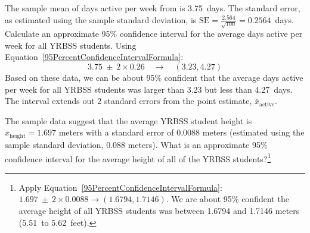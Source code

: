 \begin{spacing}{1.5}

\begin{example}{The sample mean of days active per week from  is 3.75~days. The standard error, as estimated using the sample standard deviation, is $\text{SE}=\frac{2.564}{\sqrt{100}} = 0.2564$~days. Calculate an approximate 95\% confidence interval for the average days active per week for all YRBSS students.}
Using Equation~\ref{95PercentConfidenceIntervalFormula}:
\[3.75\ \pm\ 2 \times  0.26 \quad \rightarrow \quad (3.23, 4.27)\]
Based on these data, we can be about 95\% confident that the average days active per week for all YRBSS students was larger than 3.23 but less than 4.27~days. The interval extends out 2 standard errors from the point estimate, $\overline{x}_{\text{active}}$.
\end{example}

\begin{exercise} \label{95CIExerciseForAgeOfYrbssSamp1}
The sample data suggest that the average YRBSS student height is $\overline{x}_{\text{height}} = 1.697$ meters with a standard error of 0.0088 meters (estimated using the sample standard deviation, 0.088 meters). What is an approximate 95\% confidence interval for the average height of all of the YRBSS students?\footnote{Apply Equation~\ref{95PercentConfidenceIntervalFormula}: $1.697 \ \pm \ 2\times 0.0088 \rightarrow (1.6794, 1.7146)$.  We are about 95\% confident the average height of all YRBSS students was between 1.6794 and 1.7146 meters (5.51~to 5.62~feet).}
\end{exercise}


\end{spacing}
